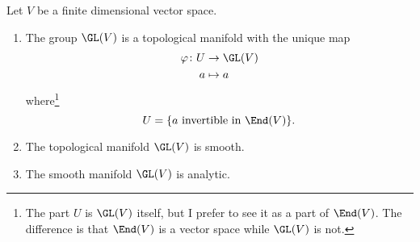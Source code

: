 \begin{proposition}	\label{PROPooQJANooMaqLvV}
	Let \( V\) be a finite dimensional vector space.

	\begin{enumerate}
		\item

		      The group \( \GL(V)\) is a topological manifold with the unique map
		      \begin{equation}
			      \begin{aligned}
				      \varphi\colon U & \to \GL(V) \\
				      a               & \mapsto a
			      \end{aligned}
		      \end{equation}
		      where\footnote{The part \( U\) is \( \GL(V) \) itself, but I prefer to see it as a part of \( \End(V)\). The difference is that \( \End(V) \) is a vector space while \( \GL(V)\) is not.}
		      \begin{equation}
			      U=\{ \text{\( a\) invertible in \( \End(V)\)} \}.
		      \end{equation}
		\item
		      The topological manifold \( \GL(V)\) is smooth.
		\item
		      The smooth manifold \( \GL(V)\) is analytic.
	\end{enumerate}
\end{proposition}

